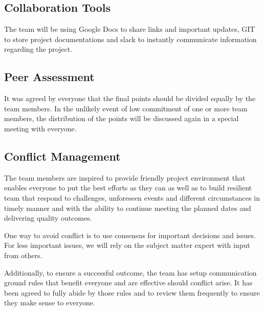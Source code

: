 \documentclass{article}
\begin{document}
\subsection{Collaboration Tools} The team will be using Google Docs to share links and important updates, GIT to store project documentations and slack to instantly communicate information regarding the project.

\subsection{Peer Assessment} It was agreed by everyone that the final points should be divided equally by the team members. In the unlikely event of low commitment of one or more team members, the distribution of the points will be discussed again in a special meeting with everyone.

\subsection{Conflict Management}
The team members are inspired to provide friendly project environment that enables everyone to put the best efforts as they can as well as to build resilient team that respond to challenges, unforeseen events and different circumstances in timely manner and with the ability to continue meeting the planned dates and delivering quality outcomes.

One way to avoid conflict is to use consensus for important decisions and issues. For less important issues, we will rely on the subject matter expert with input from others.

Additionally, to ensure a successful outcome, the team has setup communication ground rules that benefit everyone and are effective should conflict arise. It has been agreed to fully abide by those rules and to review them frequently to ensure they make sense to everyone.
\end{document}

